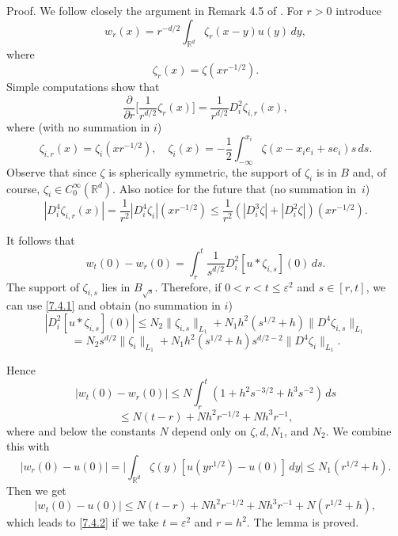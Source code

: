 \documentclass[11pt, reqno]{amsart}
\theoremstyle{definition}
\theoremstyle{remark}
\begin{document}
Proof. We follow closely the argument in Remark 4.5
of \cite{DK05}. For $r>0$ introduce
$$
w_{r}(x)=r^{-d/2}\int_{{\mathbb{R}}^{d}}\zeta_{r}(x-y)u(y)\,dy,
$$
where
$$
\zeta_{r}(x)=\zeta(xr^{-1/2}).
$$
Simple computations show that
$$
\frac{\partial}{\partial r}\big[\frac{1}{r^{d/2}}\zeta_{r}(x)\big]=
\frac{1}{r^{d/2}}D^{2}_{i}\zeta_{i,r}(x),
$$
where (with no summation in $i$)
$$
\zeta_{i,r}(x)=\zeta_{i}(xr^{-1/2}),\quad
\zeta_{i}(x)=-\frac{1}{2}\int_{-\infty}^{x_{i}}
\zeta(x-x_{i}e_{i}+se_{i})s\,ds.
$$
Observe that since $\zeta$ is spherically symmetric,
the support of $\zeta_{i}$ is in $B $ and, of course,
$\zeta_{i}\in C^{\infty}_{0}({\mathbb{R}}^{d})$. Also notice for the future that
(no summation in~$i$)
$$
|D^{4}_{i}\zeta_{i,r}(x)|=\frac{1}{r^{2}}|D^{4}_{i}\zeta_{i}|
 (xr^{-1/2} )\leq \frac{1}{r^{2}}(
 |D^{3}_{i}\zeta|+|D^{2}_{i}\zeta|)(xr^{-1/2} ).
$$

It follows that  
$$
w_{t}(0)-w_{r}(0) =\int_{r}^{t}
\frac{1}{s^{d/2}}D^{2}_{i}[u*\zeta_{i,s}](0)\,ds.
$$
The support of $\zeta_{i,s}$ lies in $B_{\sqrt{s}}$.
Therefore, if    $0<r<t\leq\varepsilon^{2}$ 
and $s\in[r,t]$, we can use \eqref{7.4.1} 
and obtain (no summation in $i$)
$$
|D^{2}_{i}[u*\zeta_{i,s}](0)|\leq N_{2}\|\zeta_{i,s}\|_{L_{1}}
+N_{1}
 h^{2}(s^{1/2}+h) \|D^{4}\zeta_{i,s}\|_{L_{1}}
$$
$$
=N_{2}s^{d/2}\|\zeta_{i }\|_{L_{1}}
+N_{1}
 h^{2}(s^{1/2}+h)s^{d/2-2} \|D^{4}\zeta_{i }\|_{L_{1}}.
$$

Hence
$$
|w_{t}(0)-w_{r}(0)|\leq N\int_{r}^{t}(1+h^{2}s^{-3/2}+h^{3}s^{-2})
\,ds
$$
$$
\leq N(t-r)+Nh^{2}r^{-1/2}+Nh^{3}r^{-1},
$$
where and below the constants $N$ 
depend only on $\zeta,d,N_{1}$, and $N_{2}$. We combine this
with
$$
|w_{r}(0)-u(0)|=\big|\int_{{\mathbb{R}}^{d}}\zeta(y)[u( yr^{1/2})-u(0)]
\,dy\big|\leq N_{1}(r^{1/2}+h).
$$
Then we get
$$
|w_{t}(0)-u(0)|
\leq N(t-r)+Nh^{2}r^{-1/2}+Nh^{3}r^{-1}+N(r^{1/2}+h),
$$
 which leads to \eqref{7.4.2} if we take $t=\varepsilon^{2}$
and $r=h^{2}$. The lemma is proved.
\end{document}
